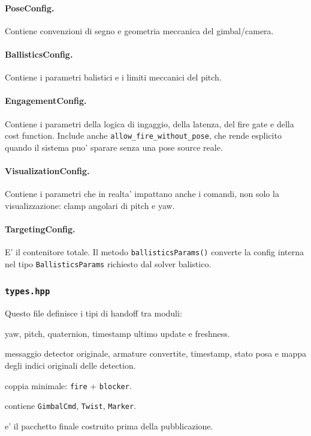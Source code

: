 \documentclass[11pt,a4paper]{article}
\newcommand{\code}[1]{\texttt{#1}}
\begin{document}
\paragraph{PoseConfig.}
Contiene convenzioni di segno e geometria meccanica del gimbal/camera.

\paragraph{BallisticsConfig.}
Contiene i parametri balistici e i limiti meccanici del pitch.

\paragraph{EngagementConfig.}
Contiene i parametri della logica di ingaggio, della latenza, del fire gate e della cost function. Include anche \code{allow\_fire\_without\_pose}, che rende esplicito quando il sistema puo' sparare senza una pose source reale.

\paragraph{VisualizationConfig.}
Contiene i parametri che in realta' impattano anche i comandi, non solo la visualizzazione: clamp angolari di pitch e yaw.

\paragraph{TargetingConfig.}
E' il contenitore totale. Il metodo \code{ballisticsParams()} converte la config interna nel tipo \code{BallisticsParams} richiesto dal solver balistico.

\subsubsection{\code{types.hpp}}

Questo file definisce i tipi di handoff tra moduli:
\begin{description}[leftmargin=1.8em, style=nextline]
  \item[\code{GimbalPoseState}] yaw, pitch, quaternion, timestamp ultimo update e freshness.
  \item[\code{Observation}] messaggio detector originale, armature convertite, timestamp, stato posa e mappa degli indici originali delle detection.
  \item[\code{FireGateResult}] coppia minimale: \code{fire} + \code{blocker}.
  \item[\code{CommandOutput}] contiene \code{GimbalCmd}, \code{Twist}, \code{Marker}.
  \item[\code{AimResult}] e' il pacchetto finale costruito prima della pubblicazione.
\end{description}
\end{document}

